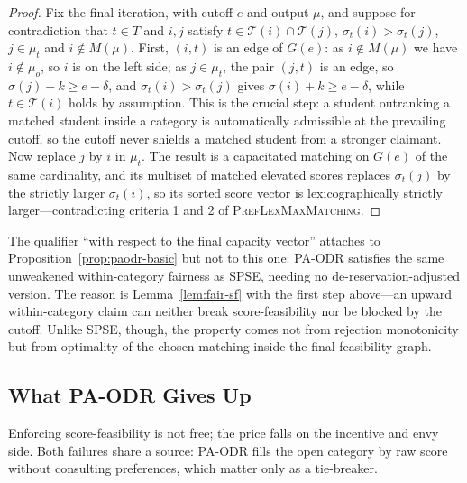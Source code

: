 \documentclass[a4paper,twoside]{article}
\theoremstyle{definition}
\renewcommand{\T}{\mathcal{T}}
\begin{document}
\begin{proof}
Fix the final iteration, with cutoff $e$ and output $\mu$, and suppose for contradiction that $t\in T$ and $i,j$ satisfy $t\in\T(i)\cap\T(j)$, $\sigma_t(i)>\sigma_t(j)$, $j\in\mu_t$ and $i\notin M(\mu)$. First, $(i,t)$ is an edge of $G(e)$: as $i\notin M(\mu)$ we have $i\notin\mu_o$, so $i$ is on the left side; as $j\in\mu_t$, the pair $(j,t)$ is an edge, so $\sigma(j)+k\ge e-\delta$, and $\sigma_t(i)>\sigma_t(j)$ gives $\sigma(i)+k\ge e-\delta$, while $t\in\T(i)$ holds by assumption. This is the crucial step: a student outranking a matched student inside a category is automatically admissible at the prevailing cutoff, so the cutoff never shields a matched student from a stronger claimant. Now replace $j$ by $i$ in $\mu_t$. The result is a capacitated matching on $G(e)$ of the same cardinality, and its multiset of matched elevated scores replaces $\sigma_t(j)$ by the strictly larger $\sigma_t(i)$, so its sorted score vector is lexicographically strictly larger---contradicting criteria 1 and 2 of \textsc{PrefLexMaxMatching}.
\end{proof}

The qualifier ``with respect to the final capacity vector'' attaches to Proposition~\ref{prop:paodr-basic} but not to this one: PA-ODR satisfies the same unweakened within-category fairness as SPSE, needing no de-reservation-adjusted version. The reason is Lemma~\ref{lem:fair-sf} with the first step above---an upward within-category claim can neither break score-feasibility nor be blocked by the cutoff. Unlike SPSE, though, the property comes not from rejection monotonicity but from optimality of the chosen matching inside the final feasibility graph.

\subsection{What PA-ODR Gives Up}
\label{sec:paodr-limits}

Enforcing score-feasibility is not free; the price falls on the incentive and envy side. Both failures share a source: PA-ODR fills the open category by raw score without consulting preferences, which matter only as a tie-breaker.
\end{document}
